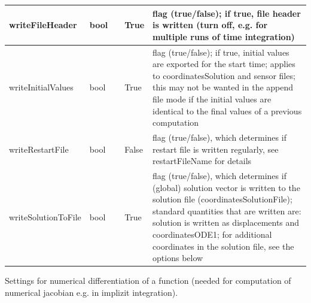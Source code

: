 \begin{center}
\begin{longtable}{| p{4.2cm} | p{2.5cm} | p{0.3cm} | p{3.0cm} | p{6cm} |}
    writeFileHeader &     bool &      &     True &     flag (true/false); if true, file header is written (turn off, e.g. for multiple runs of time integration)\\ \hline
    writeInitialValues &     bool &      &     True &     flag (true/false); if true, initial values are exported for the start time; applies to coordinatesSolution and sensor files; this may not be wanted in the append file mode if the initial values are identical to the final values of a previous computation\\ \hline
    writeRestartFile &     bool &      &     False &     flag (true/false), which determines if restart file is written regularly, see restartFileName for details\\ \hline
    writeSolutionToFile &     bool &      &     True &     flag (true/false), which determines if (global) solution vector is written to the solution file (coordinatesSolutionFile); standard quantities that are written are: solution is written as displacements and coordinatesODE1; for additional coordinates in the solution file, see the options below\\ \hline
	  \end{longtable}
	\end{center}



\label{sec:NumericalDifferentiationSettings}
Settings for numerical differentiation of a function (needed for computation of numerical jacobian e.g. in implizit integration).

